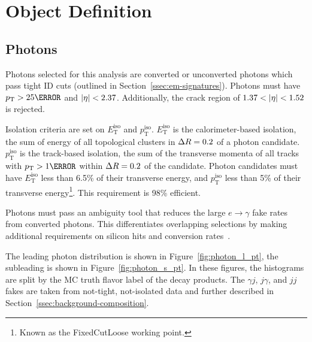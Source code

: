 \section{Object Definition}
\subsection{Photons}

Photons selected for this analysis are converted or unconverted photons which pass tight ID cuts (outlined in Section~\ref{ssec:em-signatures}). Photons must have $\pt > \unit{25}{\GeV}$ and $|\eta| < 2.37$. Additionally, the crack region of $1.37 < |\eta| < 1.52$ is rejected.

Isolation criteria are set on $E_{\text{T}}^{\text{iso}}$ and $p_{\text{T}}^{\text{iso}}$. $E_{\text{T}}^{\text{iso}}$ is the calorimeter-based isolation, the sum of energy of all topological clusters in $\Delta R = 0.2$ of a photon candidate. $p_{\text{T}}^{\text{iso}}$ is the track-based isolation, the sum of the transverse momenta of all tracks with $\pt > \unit{1}{\GeV}$ within $\Delta R = 0.2$ of the candidate. Photon candidates must have $E_{\text{T}}^{\text{iso}}$ less than 6.5\% of their transverse energy, and $p_{\text{T}}^{\text{iso}}$ less than 5\% of their transverse energy\footnote{Known as the FixedCutLoose working point.}. This requirement is 98\% efficient. 


Photons must pass an ambiguity tool that reduces the large $e\rightarrow\gamma$ fake rates from converted photons. This differentiates overlapping selections by making additional requirements on silicon hits and conversion rates~\cite{r1-photonID}.

The leading photon \pt distribution is shown in Figure~\ref{fig:photon_l_pt}, the subleading is shown in Figure~\ref{fig:photon_s_pt}. In these figures, the histograms are split by the \gls{MC} truth flavor label of the \Hbb decay products. The $\gamma j$, $j\gamma$, and $jj$ fakes are taken from not-tight, not-isolated data and further described in Section~\ref{ssec:background-composition}.

